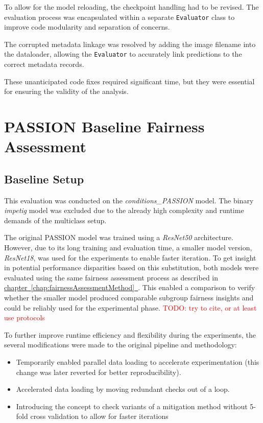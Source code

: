 \documentclass[12pt, a4paper, oneside]{book}   	%
\renewcommand{\todo}[1]{\textcolor{red}{TODO: #1}}
\newcommand{\linkchap}[1]{\hyperref[#1]{chapter~\ref{#1}~\nameref{#1}}}
\begin{document}
		To allow for the model reloading, the checkpoint handling had to be revised. The evaluation process was encapsulated within a separate \texttt{Evaluator} class to improve code modularity and separation of concerns.
		
		The corrupted metadata linkage was resolved by adding the image filename into the dataloader, allowing the \texttt{Evaluator} to accurately link predictions to the correct metadata records.
		
		These unanticipated code fixes required significant time, but they were essential for ensuring the validity of the analysis.

		
		\section{PASSION Baseline Fairness Assessment} \label{chap:PASSIONFairnessAssessmentBaselineExecution}
		
		\subsection{Baseline Setup}
		This evaluation was conducted on the \textit{conditions\_PASSION} model. The binary \textit{impetig} model was excluded due to the already high complexity and runtime demands of the multiclass setup.
		
		The original PASSION model was trained using a \textit{ResNet50} architecture. However, due to its long training and evaluation time, a smaller model version, \textit{ResNet18}, was used for the experiments to enable faster iteration. To get insight in potential performance disparities based on this substitution, both models were evaluated using the same fairness assessment process as described in \linkchap{chap:fairnessAssessmentMethod}. This enabled a comparison to verify whether the smaller model produced comparable subgroup fairness insights and could be reliably used for the experimental phase.
		\todo{try to cite, or at least use protocols}
		
		To further improve runtime efficiency and flexibility during the experiments, the several modifications were made to the original pipeline and methodology:
		
		\begin{itemize}
			\item Temporarily enabled parallel data loading to accelerate experimentation (this change was later reverted for better reproducibility).
			\item Accelerated data loading by moving redundant checks out of a loop.
			\item Introducing the concept to check variants of a mitigation method without 5-fold cross validation to allow for faster iterations
		\end{itemize}
		
\end{document}
